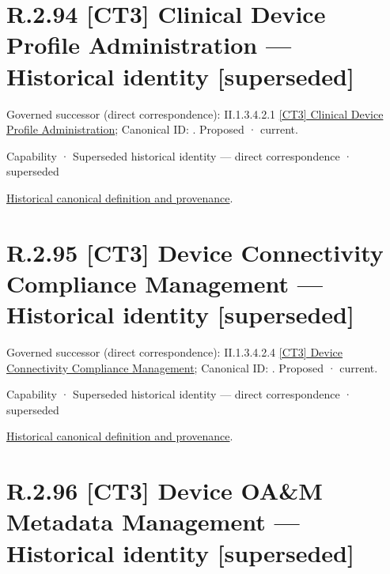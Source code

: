 \section*{R.2.94 [CT3] Clinical Device Profile Administration — Historical identity [superseded]}
\label{navigation:R.2.94}

{\small Governed successor (direct correspondence): II.1.3.4.2.1 \hyperref[element:d0a1ba80c790476ea6042290eb7ea09e]{[CT3] Clinical Device Profile Administration}; Canonical ID: \texttt{}. Proposed · current.}\par
\label{element:e8c72952da144d6883caba7fd2afb88d}
{\small Capability · Superseded historical identity — direct correspondence · superseded}\par
\href{../../../../../../../continuum/strategy/capability/e8c72952da144d6883caba7fd2afb88d.md}{Historical canonical definition and provenance}.\par
\section*{R.2.95 [CT3] Device Connectivity Compliance Management — Historical identity [superseded]}
\label{navigation:R.2.95}

{\small Governed successor (direct correspondence): II.1.3.4.2.4 \hyperref[element:b16ab359030a4583868f3aac2221074e]{[CT3] Device Connectivity Compliance Management}; Canonical ID: \texttt{}. Proposed · current.}\par
\label{element:9225f083d3474715a75af2a827a4016d}
{\small Capability · Superseded historical identity — direct correspondence · superseded}\par
\href{../../../../../../../continuum/strategy/capability/9225f083d3474715a75af2a827a4016d.md}{Historical canonical definition and provenance}.\par
\section*{R.2.96 [CT3] Device OA\&M Metadata Management — Historical identity [superseded]}
\label{navigation:R.2.96}

